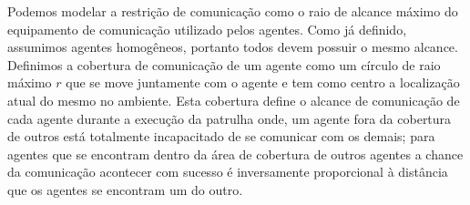 Podemos modelar a restrição de comunicação como o raio de alcance máximo do 
equipamento de comunicação utilizado pelos agentes. Como já definido, assumimos 
agentes homogêneos, portanto todos devem possuir o mesmo alcance. Definimos a 
cobertura de comunicação de um agente como um círculo de raio máximo $r$ que se 
move juntamente com o agente e tem como centro a localização atual do mesmo no 
ambiente. Esta cobertura define o alcance de comunicação de cada agente durante 
a execução da patrulha onde, um agente fora da cobertura de outros está 
totalmente incapacitado de se comunicar com os demais; para agentes que se 
encontram dentro da área de cobertura de outros agentes a chance da comunicação 
acontecer com sucesso é inversamente proporcional à distância que os agentes se 
encontram um do outro.
